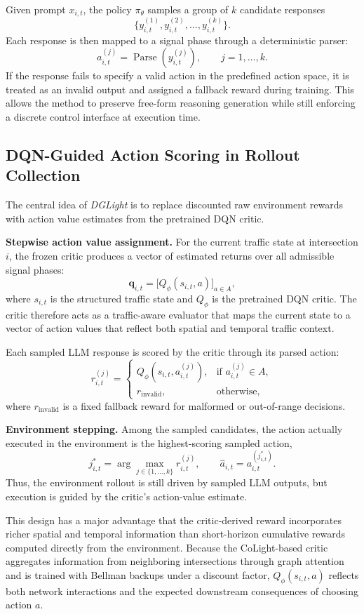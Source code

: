 Given prompt $x_{i,t}$, the policy $\pi_\theta$ samples a group of $k$ candidate responses
\[
\{y_{i,t}^{(1)}, y_{i,t}^{(2)}, \dots, y_{i,t}^{(k)}\}.
\]
Each response is then mapped to a signal phase through a deterministic parser:
\[
a_{i,t}^{(j)} = \operatorname{Parse}(y_{i,t}^{(j)}), \qquad j = 1, \dots, k.
\]
If the response fails to specify a valid action in the predefined action space, it is treated as an invalid output and assigned a fallback reward during training. This allows the method to preserve free-form reasoning generation while still enforcing a discrete control interface at execution time.

\subsection{DQN-Guided Action Scoring in Rollout Collection}
The central idea of \textit{DGLight} is to replace discounted raw environment rewards with action value estimates from the pretrained DQN critic.

\textbf{Stepwise action value assignment.} For the current traffic state at intersection $i$, the frozen critic produces a vector of estimated returns over all admissible signal phases:
\[
\mathbf{q}_{i,t} = \bigl[ Q_\phi(s_{i,t}, a) \bigr]_{a \in A},
\]
where $s_{i,t}$ is the structured traffic state and $Q_\phi$ is the pretrained DQN critic. The critic therefore acts as a traffic-aware evaluator that maps the current state to a vector of action values that reflect both spatial and temporal traffic context.

Each sampled LLM response is scored by the critic through its parsed action:
\[
r_{i,t}^{(j)} =
\begin{cases}
Q_\phi\!\left(s_{i,t}, a_{i,t}^{(j)}\right), & \text{if } a_{i,t}^{(j)} \in A, \\
r_{\mathrm{invalid}}, & \text{otherwise},
\end{cases}
\]
where $r_{\mathrm{invalid}}$ is a fixed fallback reward for malformed or out-of-range decisions. 

\textbf{Environment stepping.} Among the sampled candidates, the action actually executed in the environment is the highest-scoring sampled action,
\[
j_{i,t}^{*} = \arg\max_{j \in \{1,\dots,k\}} r_{i,t}^{(j)},
\qquad
\hat a_{i,t} = a_{i,t}^{(j_{i,t}^{*})}.
\]
Thus, the environment rollout is still driven by sampled LLM outputs, but execution is guided by the critic's action-value estimate.

This design has a major advantage that the critic-derived reward incorporates richer spatial and temporal information than short-horizon cumulative rewards computed directly from the environment. Because the CoLight-based critic aggregates information from neighboring intersections through graph attention and is trained with Bellman backups under a discount factor, $Q_\phi(s_{i,t}, a)$ reflects both network interactions and the expected downstream consequences of choosing action $a$. 

